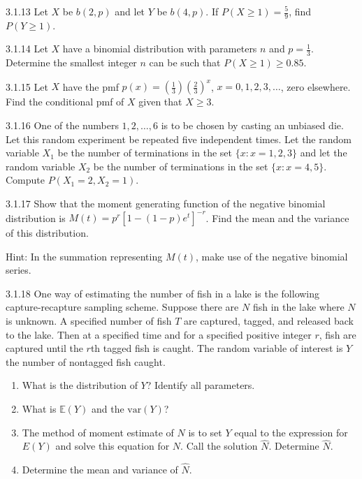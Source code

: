 \begin{exercise}{3.1.13}
Let $X$ be $b(2,p)$ and let $Y$ be $b(4,p)$. If $P(X \geq 1) = \frac{5}{9}$, find $P(Y \geq 1)$.
\end{exercise}

\begin{exercise}{3.1.14}
Let $X$ have a binomial distribution with parameters $n$ and $p = \frac{1}{3}$. Determine the smallest integer $n$ can be such that $P(X \geq 1) \geq 0.85$.
\end{exercise}

\begin{exercise}{3.1.15}
Let $X$ have the pmf $p(x) = \left(\frac{1}{3}\right)\left(\frac{2}{3}\right)^x$, $x = 0, 1, 2, 3, \ldots$, zero elsewhere. Find the conditional pmf of $X$ given that $X \geq 3$.
\end{exercise}

\begin{exercise}{3.1.16}
One of the numbers $1, 2, \ldots, 6$ is to be chosen by casting an unbiased die. Let this random experiment be repeated five independent times. Let the random variable $X_1$ be the number of terminations in the set $\{x: x = 1, 2, 3\}$ and let the random variable $X_2$ be the number of terminations in the set $\{x: x = 4, 5\}$. Compute $P(X_1 = 2, X_2 = 1)$.
\end{exercise}

\begin{exercise}{3.1.17}
Show that the moment generating function of the negative binomial distribution is $M(t) = p^r[1 - (1-p)e^t]^{-r}$. Find the mean and the variance of this distribution.

Hint: In the summation representing $M(t)$, make use of the negative binomial series.
\end{exercise}

\begin{exercise}{3.1.18}
One way of estimating the number of fish in a lake is the following capture-recapture sampling scheme. Suppose there are $N$ fish in the lake where $N$ is unknown. A specified number of fish $T$ are captured, tagged, and released back to the lake. Then at a specified time and for a specified positive integer $r$, fish are captured until the $r$th tagged fish is caught. The random variable of interest is $Y$ the number of nontagged fish caught.
\begin{enumerate}
\item What is the distribution of $Y$? Identify all parameters.
\item What is $\mathbb{E}(Y)$ and the $\text{var}(Y)$?
\item The method of moment estimate of $N$ is to set $Y$ equal to the expression for $E(Y)$ and solve this equation for $N$. Call the solution $\hat{N}$. Determine $\hat{N}$.
\item Determine the mean and variance of $\hat{N}$.
\end{enumerate}
\end{exercise}

